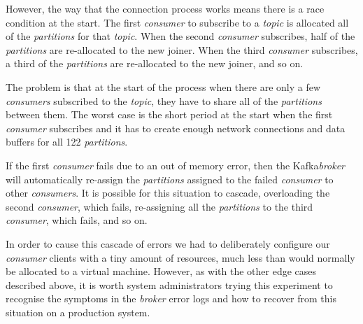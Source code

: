 \documentclass{article}
\newcommand{\kafka} {Kafka\xspace}
\newcommand{\kftopic} {\textit{topic}\xspace}
\newcommand{\kfbroker} {\textit{broker}\xspace}
\newcommand{\kfconsumer} {\textit{consumer}\xspace}
\newcommand{\kfconsumers} {\textit{consumers}\xspace}
\newcommand{\kfpartitions} {\textit{partitions}\xspace}
\begin{document}
However, the way that the connection process works means there is a race condition at the start.
The first \kfconsumer to subscribe to a \kftopic is allocated all of the \kfpartitions for that \kftopic.
When the second \kfconsumer subscribes, half of the \kfpartitions are re-allocated to the new joiner.
When the third \kfconsumer subscribes, a third of the \kfpartitions are re-allocated to the new joiner, and so on.

The problem is that at the start of the process when there are only a few \kfconsumers subscribed to the \kftopic, they have to share all of the \kfpartitions between them.
The worst case is the short period at the start when the first \kfconsumer subscribes and it has to create enough network connections and data buffers for all 122 \kfpartitions.

If the first \kfconsumer fails due to an out of memory error, then the \kafka \kfbroker will automatically re-assign the \kfpartitions assigned to the failed \kfconsumer to other \kfconsumers. It is possible for this situation to cascade, overloading the second \kfconsumer, which fails, re-assigning all the \kfpartitions to the third \kfconsumer, which fails, and so on.

In order to cause this cascade of errors we had to deliberately configure our \kfconsumer clients with a tiny amount of resources, much less than would normally be allocated to a virtual machine.
However, as with the other edge cases described above, it is worth system administrators trying this experiment to recognise the symptoms in the \kfbroker error logs and how to recover from this situation on a production system.

\printbibliography
\end{document}
